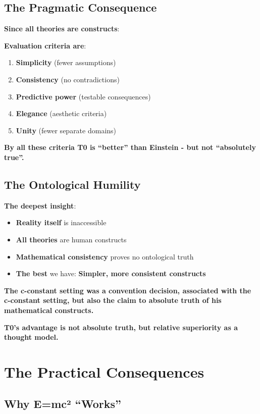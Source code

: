 	\subsection{The Pragmatic Consequence}
	
	\textbf{Since all theories are constructs}:
	
	\textbf{Evaluation criteria are}:
	\begin{enumerate}
		\item \textbf{Simplicity} (fewer assumptions)
		\item \textbf{Consistency} (no contradictions)
		\item \textbf{Predictive power} (testable consequences)
		\item \textbf{Elegance} (aesthetic criteria)
		\item \textbf{Unity} (fewer separate domains)
	\end{enumerate}
	
	\textbf{By all these criteria T0 is ``better'' than Einstein - but not ``absolutely true''.}
	
	\subsection{The Ontological Humility}
	
	\textbf{The deepest insight}:
	\begin{itemize}
		\item \textbf{Reality itself} is inaccessible
		\item \textbf{All theories} are human constructs
		\item \textbf{Mathematical consistency} proves no ontological truth
		\item \textbf{The best} we have: \textbf{Simpler, more consistent constructs}
	\end{itemize}
	
	\textbf{The c-constant setting was a convention decision, associated with the c-constant setting, but also the claim to absolute truth of his mathematical constructs.}
	
	\textbf{T0's advantage is not absolute truth, but relative superiority as a thought model.}
	
	\section{The Practical Consequences}
	
	\subsection{Why E=mc² ``Works''}
	
